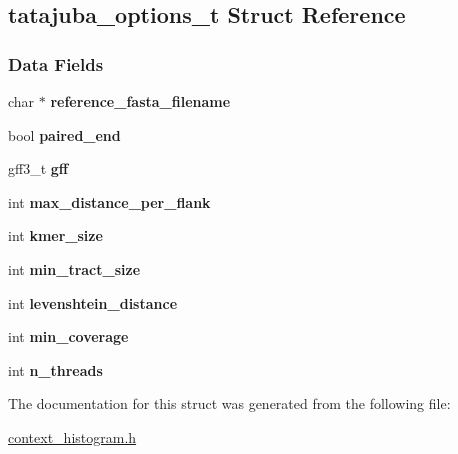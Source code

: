 \hypertarget{structtatajuba__options__t}{}\subsection{tatajuba\+\_\+options\+\_\+t Struct Reference}
\label{structtatajuba__options__t}
\subsubsection*{Data Fields}
\begin{DoxyCompactItemize}
\item 
\mbox{\label{structtatajuba__options__t_aef332f0338fa9ed9cf321656ed6f299a}} 
char $\ast$ {\bfseries reference\+\_\+fasta\+\_\+filename}
\item 
\mbox{\label{structtatajuba__options__t_a3a26c2e9f1bb0be577af3c0735139465}} 
bool {\bfseries paired\+\_\+end}
\item 
\mbox{\label{structtatajuba__options__t_aa047be2488f048dca8f0361e6862e87c}} 
gff3\+\_\+t {\bfseries gff}
\item 
\mbox{\label{structtatajuba__options__t_a08ac0f3e17d0395aa8c465027612208f}} 
int {\bfseries max\+\_\+distance\+\_\+per\+\_\+flank}
\item 
\mbox{\label{structtatajuba__options__t_a172b666dc113b338535ebc2470ece295}} 
int {\bfseries kmer\+\_\+size}
\item 
\mbox{\label{structtatajuba__options__t_aab235ff8f2e1b66ca23e44a52e4fb087}} 
int {\bfseries min\+\_\+tract\+\_\+size}
\item 
\mbox{\label{structtatajuba__options__t_a1ac19dd3786482356f8843972e2b8ee5}} 
int {\bfseries levenshtein\+\_\+distance}
\item 
\mbox{\label{structtatajuba__options__t_afa3f72929d02040967cfa55ab5132eaa}} 
int {\bfseries min\+\_\+coverage}
\item 
\mbox{\label{structtatajuba__options__t_aadcc091f814b762f8e3bec3e7fd68911}} 
int {\bfseries n\+\_\+threads}
\end{DoxyCompactItemize}


The documentation for this struct was generated from the following file\+:\begin{DoxyCompactItemize}
\item 
\hyperlink{context__histogram_8h}{context\+\_\+histogram.\+h}\end{DoxyCompactItemize}
